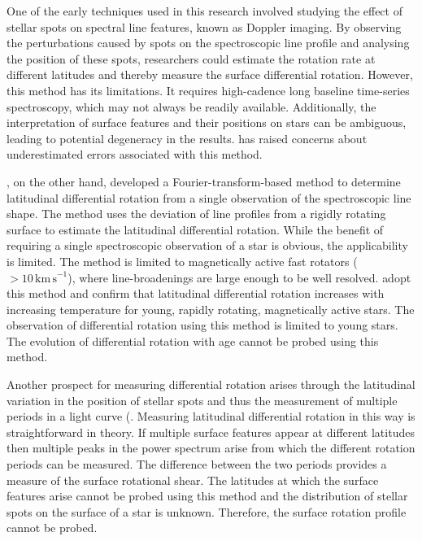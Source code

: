 One of the early techniques used in this research involved studying the effect of stellar spots on spectral line features, known as Doppler imaging. 
By observing the perturbations caused by spots on the spectroscopic line profile and analysing the position of these spots, researchers could estimate the rotation rate at different latitudes and thereby measure the surface differential rotation. However, this method has its limitations. It requires high-cadence long baseline time-series spectroscopy, which may not always be readily available. Additionally, the interpretation of surface features and their positions on stars can be ambiguous, leading to potential degeneracy in the results. 
\citet{collier_differential_2007} has raised concerns about underestimated errors associated with this method.

\citet{reiners_rotation_2002}, on the other hand, developed a Fourier-transform-based method to determine latitudinal differential rotation from a single observation of the spectroscopic line shape.
The method uses the deviation of line profiles from a rigidly rotating surface to estimate the latitudinal differential rotation.
While the benefit of requiring a single spectroscopic observation of a star is obvious, the applicability is limited.
The method is limited to magnetically active fast rotators (\vsini\ $> 10\,\mathrm{km\,s}^{-1}$), where line-broadenings are large enough to be well resolved.
\citet{barnes_dependence_2005, reiners_rotation_2002} adopt this method and confirm that latitudinal differential rotation increases with increasing temperature for young, rapidly rotating, magnetically active stars.
The observation of differential rotation using this method is limited to young stars.
The evolution of differential rotation with age cannot be probed using this method.

Another prospect for measuring differential rotation arises through the latitudinal variation in the position of stellar spots and thus the measurement of multiple periods in a light curve (\citep[see, e.g.,][]{walcowicz_rotation_2013, reinhold_rotation_2013}.
Measuring latitudinal differential rotation in this way is straightforward in theory.
If multiple surface features appear at different latitudes then multiple peaks in the power spectrum arise from which the different rotation periods can be measured.
The difference between the two periods provides a measure of the surface rotational shear.
The latitudes at which the surface features arise cannot be probed using this method and the distribution of stellar spots on the surface of a star is unknown.
Therefore, the surface rotation profile cannot be probed.

